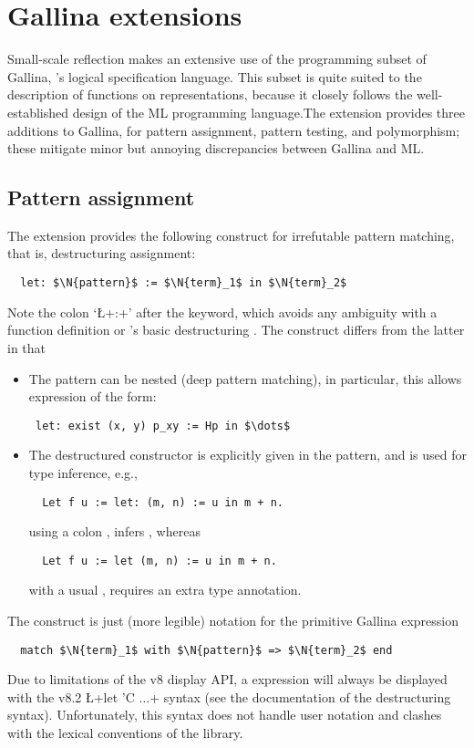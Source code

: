 \section{Gallina extensions}

Small-scale reflection makes an extensive use of the programming
subset of Gallina, \Coq{}'s logical specification language. This subset
is quite suited to the description of functions on representations,
because it closely follows the well-established design of the ML
programming language.The \ssr{} extension provides three additions
to Gallina, for pattern assignment, pattern testing, and polymorphism;
these mitigate minor but annoying discrepancies between Gallina and ML.

\subsection{Pattern assignment}\label{ssec:patass}
The \ssr{} extension provides the following construct for
irrefutable pattern matching, that is, destructuring assignment:
\begin{lstlisting}
  let: $\N{pattern}$ := $\N{term}_1$ in $\N{term}_2$
\end{lstlisting}
Note the colon `\L+:+' after the  keyword, which avoids any
ambiguity with a function
definition or \Coq{}'s basic destructuring . The 
construct differs from the latter in that
\begin{itemize}
\item The pattern can be nested (deep pattern matching), in
  particular, this allows expression of the form:
\begin{lstlisting}
 let: exist (x, y) p_xy := Hp in $\dots$
\end{lstlisting}
\item The destructured constructor is explicitly given in the
  pattern, and is used for type inference, e.g.,
\begin{lstlisting}
  Let f u := let: (m, n) := u in m + n.
\end{lstlisting}
using a colon , infers , whereas
\begin{lstlisting}
  Let f u := let (m, n) := u in m + n.
\end{lstlisting}
with a usual , requires an extra type annotation.
\end{itemize}
The  construct is just (more legible) notation for the primitive Gallina expression
\begin{lstlisting}
  match $\N{term}_1$ with $\N{pattern}$ => $\N{term}_2$ end
\end{lstlisting}
Due to limitations of the \Coq{} v8 display API, a  expression
will always be displayed with the \Coq{} v8.2 \L+let 'C $\dots$+ syntax
(see the \Coq{} documentation of the destructuring 
syntax). Unfortunately, this syntax does not handle user notation and
clashes with the lexical conventions of the \ssr{} library.

